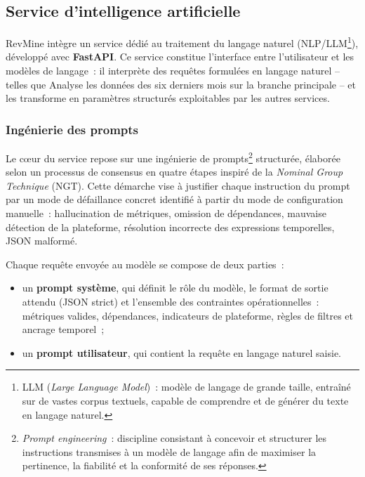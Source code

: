 \subsection{Service d'intelligence artificielle}

RevMine intègre un service dédié au traitement du langage naturel (NLP/LLM\footnote{LLM
(\textit{Large Language Model})~: modèle de langage de grande taille, entraîné sur de vastes
corpus textuels, capable de comprendre et de générer du texte en langage naturel.}), développé
avec \textbf{FastAPI}. Ce service constitue l'interface entre l'utilisateur et les modèles de
langage~: il interprète des requêtes formulées en langage naturel -- telles que \og{}Analyse les
données des six derniers mois sur la branche principale\fg{} -- et les transforme en paramètres
structurés exploitables par les autres services.

\subsubsection*{Ingénierie des prompts}

Le c\oe{}ur du service repose sur une ingénierie de prompts\footnote{\textit{Prompt engineering}~:
discipline consistant à concevoir et structurer les instructions transmises à un modèle de langage
afin de maximiser la pertinence, la fiabilité et la conformité de ses réponses.} structurée,
élaborée selon un processus de consensus en quatre étapes inspiré de la \textit{Nominal Group
Technique} (NGT). Cette démarche vise à justifier chaque instruction du prompt par un mode de
défaillance concret identifié à partir du mode de configuration manuelle~: hallucination de
métriques, omission de dépendances, mauvaise détection de la plateforme, résolution incorrecte
des expressions temporelles, JSON malformé.

Chaque requête envoyée au modèle se compose de deux parties~:
\begin{itemize}
    \item un \textbf{prompt système}, qui définit le rôle du modèle, le format de sortie attendu
          (JSON strict) et l'ensemble des contraintes opérationnelles~: métriques valides,
          dépendances, indicateurs de plateforme, règles de filtres et ancrage temporel~;
    \item un \textbf{prompt utilisateur}, qui contient la requête en langage naturel saisie.
\end{itemize}

